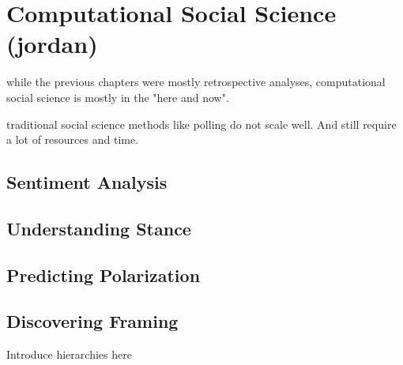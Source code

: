 
\chapter{Computational Social Science (jordan)}
\label{ch:css}

 while the previous chapters were mostly retrospective analyses, computational social science is mostly in the "here and now".

 traditional social science methods like polling do not scale well. And still require a lot of resources and time.

\section{Sentiment Analysis}

\section{Understanding Stance}

\section{Predicting Polarization}

\section{Discovering Framing}

Introduce hierarchies here


